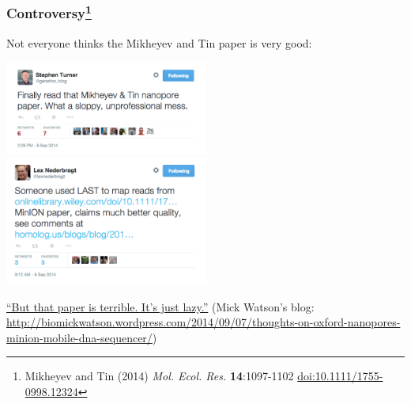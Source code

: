 \begin{frame}
  \frametitle{Controversy\footnote{\tiny{Mikheyev and Tin (2014) \textit{Mol. Ecol. Res.} \textbf{14}:1097-1102 \href{http://dx.doi.org/10.1111/1755-0998.12324}{doi:10.1111/1755-0998.12324}}}}
  Not everyone thinks the Mikheyev and Tin paper is very good:
    \begin{center}
      \includegraphics[width=0.5\textwidth]{images/nanopore_tweet_1}
      \includegraphics[width=0.5\textwidth]{images/nanopore_tweet_2}      
    \end{center}           
    \href{http://biomickwatson.wordpress.com/2014/09/07/thoughts-on-oxford-nanopores-minion-mobile-dna-sequencer/}{``But that paper is terrible. It's just lazy.''} (Mick Watson's blog: \href{http://biomickwatson.wordpress.com/2014/09/07/thoughts-on-oxford-nanopores-minion-mobile-dna-sequencer/}{http://biomickwatson.wordpress.com/2014/09/07/thoughts-on-oxford-nanopores-minion-mobile-dna-sequencer/})
\end{frame}

